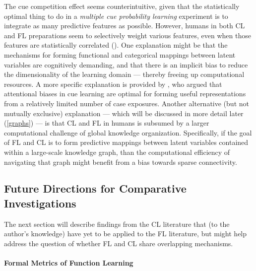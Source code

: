 \documentclass[12pt]{article}
\let\oldcite=\cite
\let\oldtextcite=\textcite
\renewcommand{\cite}[1]{\textcolor[rgb]{0, .121, .388}{\oldcite{#1}}}
\renewcommand{\textcite}[1]{\textcolor[rgb]{0, .121, .388}{\oldtextcite{#1}}}
\begin{document}
The cue competition effect seems counterintuitive, given that the statistically optimal thing to do in a \emph{multiple cue probability learning} experiment is to integrate as many predictive features as possible. However, humans in both CL and FL preparations seem to selectively weight various features, even when those features are statistically correlated (\cite{gluck1988conditioning}). One explanation might be that the mechanisms for forming functional and categorical mappings between latent variables are cognitively demanding, and that there is an implicit bias to reduce the dimensionality of the learning domain --- thereby freeing up computational resources. A more specific explanation is provided by \textcite{kruschke1999model}, who argued that attentional biases in cue learning are optimal for forming useful representations from a relatively limited number of case exposures. Another alternative (but not mutually exclusive) explanation --- which will be discussed in more detail later (\ref{graphs}) --- is that CL and FL in humans is subsumed by a larger computational challenge of global knowledge organization. Specifically, if the goal of FL and CL is to form predictive mappings between latent variables contained within a large-scale knowledge graph, than the computational efficiency of navigating that graph might benefit from a bias towards sparse connectivity.

\subsection{Future Directions for Comparative Investigations}

The next section will describe findings from the CL literature that (to the author's knowledge) have yet to be applied to the FL literature, but might help address the question of whether FL and CL share overlapping mechanisms.

\paragraph{Formal Metrics of Function Learning}\mbox{}\\
\end{document}
